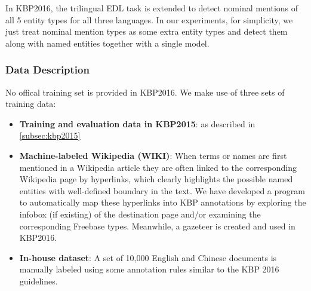 \documentclass[11pt,a4paper]{article}
\begin{document}
In KBP2016, the trilingual EDL task is extended to detect nominal mentions of all 5 entity types for all three languages. In our experiments, for simplicity, we just treat nominal mention types as some extra entity types and detect them along with named entities together with a single model.  




\subsubsection{Data Description}
No offical training set is provided in KBP2016. We make use of three sets of training data:

\begin{itemize}
	\item \textbf{Training and evaluation data in KBP2015}: as described in \ref{subsec:kbp2015}
	
	\item \textbf{Machine-labeled Wikipedia (WIKI)}: When terms or names are first mentioned in a Wikipedia article they are often linked to the corresponding Wikipedia page by hyperlinks, which clearly highlights the possible named entities with well-defined boundary in the text. We have developed a program to automatically map these hyperlinks into KBP annotations by exploring the infobox (if existing) of the destination page and/or examining the corresponding Freebase types. Meanwhile, a gazeteer is created and used in KBP2016.
	
	\item \textbf{In-house dataset}: A set of 10,000 English and Chinese documents is manually labeled using some annotation rules similar to the KBP 2016 guidelines.
	
\end{itemize}
\end{document}
